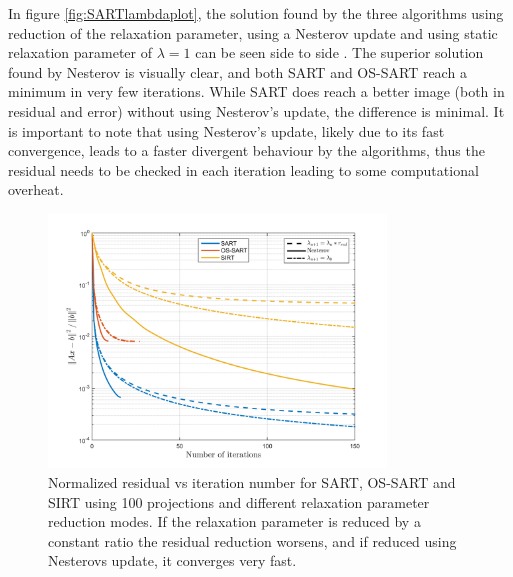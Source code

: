 In figure \ref{fig:SARTlambdaplot}, the solution found by the three algorithms using reduction of the relaxation parameter, using a Nesterov update and using static relaxation parameter of $\lambda=1$ can be seen side to side . The superior solution found by Nesterov is visually clear, and both SART and OS-SART reach a minimum in very few iterations. While SART does reach a better image (both in residual and error) without using Nesterov's update, the difference is minimal. It is important to note that using Nesterov's update, likely due to its fast convergence, leads to a faster divergent behaviour by the algorithms, thus the residual needs to be checked in each iteration leading to some computational overheat.

\begin{figure}[H]
\begin{center}

\includegraphics[width=0.8\textwidth]{Applications/SARTlambda.png} 
\end{center}

\caption[Nomralized residual vs iteration of SART/OS-SART/SIRT with different relacation parameters]{\label{fig:SARTlambda} Normalized residual vs iteration number for SART, OS-SART and SIRT using 100 projections and different relaxation parameter reduction modes. If the relaxation parameter is reduced by a constant ratio the residual reduction worsens, and if reduced using Nesterovs update, it converges very fast.} 
\end{figure}


